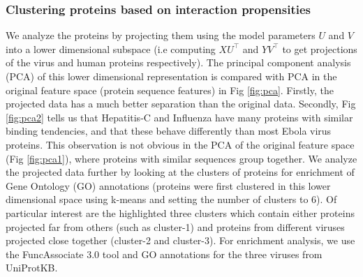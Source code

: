 \documentclass{bioinfo}
\begin{document}
\subsubsection{Clustering proteins based on interaction propensities}
We analyze the proteins by projecting them using the model parameters $U$ and $V$ into a lower dimensional subspace 
(i.e computing $X U^\intercal$ and $Y V^\intercal$ to get projections of the virus and human proteins respectively).  
The principal component analysis (PCA) of this lower dimensional representation is compared with PCA in the original feature space (protein sequence features) in Fig \ref{fig:pca}. 
Firstly, the projected data has a much better separation than the original data.
Secondly, Fig \ref{fig:pca2} tells us that Hepatitis-C and Influenza have many proteins with similar binding tendencies, and that these behave differently than most Ebola virus proteins. This observation is not obvious in the PCA of the original feature space (Fig \ref{fig:pca1}), where proteins with similar sequences group together.
We analyze the projected data further by looking at the clusters of proteins for enrichment of Gene Ontology (GO) annotations (proteins were first clustered in this lower dimensional space using k-means and setting the number of clusters to 6). Of particular interest are the highlighted three clusters which contain either proteins projected far from others (such as cluster-1) and proteins from different viruses projected close together (cluster-2 and cluster-3).
For enrichment analysis, we use the FuncAssociate 3.0 \citep{funcAsso} tool and GO annotations for the three viruses from UniProtKB.
\end{document}
